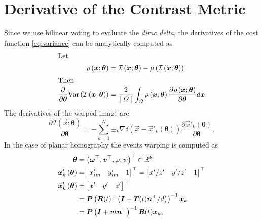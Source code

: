 \chapter{Derivative of the Contrast Metric}\label{sec:jacobian}
Since we use bilinear voting to evaluate the \textit{dirac delta}, the
derivatives of the cost function \cref{eq:variance} can be
analytically computed as
\begin{align}
  \intertext{Let}
  \rho\left(\vec{x};\bm{\theta}\right)&=\mathcal{I}\left(\vec{x};\bm{\theta}\right)-\mu\left(\mathcal{I}\left(\vec{x};\bm{\theta}\right)\right)\\
  \intertext{Then}
  \frac{\partial}{\partial\bm{\theta}}\mathrm{Var}\left(\mathcal{I}\left(\vec{x};\bm{\theta}\right)\right)&=\frac{2}{\mid\Omega\mid}\int_{\Omega}\rho\left(\vec{x};\bm{\theta}\right)\frac{\partial\rho\left(\vec{x};\bm{\theta}\right)}{\partial{\bm{\theta}}}d\vec{x}    \label{eq:dVdw}
\end{align}
The derivatives of the warped image are
\begin{equation}
  \label{eq:dIdw}
  \frac{\partial\mathcal{I}\left(\vec{x};\bm{\theta}\right)}{\partial{\bm{\theta}}}=-\sum_{k=1}^N\pm_k\nabla\delta\left(\vec{x}-\vec{x}'_k\left(\bm{\theta}\right)\right)\frac{\partial\vec{x}'_k\left(\bm{\theta}\right)}{\partial\bm{\theta}},
\end{equation}
In the case of planar homography the events warping is computed as
\begin{align}
  \bm{\theta}&=\left(\bm{\omega}^\top,\vec{v}^\top,\varphi,\psi\right)^\top\in\mathbb{R}^8\\
  \vec{x}'_k\left(\bm{\theta}\right)&=
                                      \begin{bmatrix}
                                        x'_{im}&y'_{im}&1
                                      \end{bmatrix}^\top=
  \begin{bmatrix}
    x'/z'&y'/z'&1
  \end{bmatrix}^\top\\
  \bar{\vec{x}}'_k\left(\bm{\theta}\right)&=
                                            \begin{bmatrix}
                                              x'&y'&z'
                                            \end{bmatrix}^\top\nonumber\\&=
  \mat{P}\left(\mat{R}(t)^\top\left(\mat{I}+\vec{T}(t)\vec{n}^\top/d\right)\right)^{-1}\vec{x}_k\nonumber\\
             &= \mat{P}\left(\mat{I}+\vec{v}t\vec{n}^\top\right)^{-1}\mat{R}(t)\vec{x}_k, \label{eq:x_x}
\end{align}

